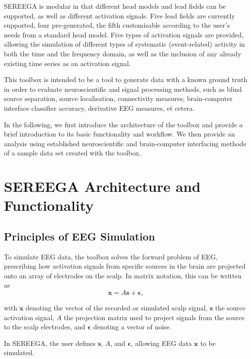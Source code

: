SEREEGA is modular in that different head models and lead fields can be supported, as well as different activation signals. Five lead fields are currently supported, four pre-generated, the fifth customisable according to the user's needs from a standard head model. Five types of activation signals are provided, allowing the simulation of different types of systematic (event-related) activity in both the time and the frequency domain, as well as the inclusion of any already existing time series as an activation signal.

This toolbox is intended to be a tool to generate data with a known ground truth in order to evaluate neuroscientific and signal processing methods, such as blind source separation, source localisation, connectivity measures, brain-computer interface classifier accuracy, derivative EEG measures, et cetera.

In the following, we first introduce the architecture of the toolbox and provide a brief introduction to its basic functionality and workflow. We then provide an analysis using established neuroscientific and brain-computer interfacing methods of a sample data set created with the toolbox. 


\section{SEREEGA Architecture and Functionality}
%

\subsection{Principles of EEG Simulation}
\label{sereega:principles}

To simulate EEG data, the toolbox solves the forward problem of EEG, prescribing how activation signals from specific sources in the brain are projected onto an array of electrodes on the scalp. In matrix notation, this can be written as
$$\bm{x} = A\bm{s} + \bm{\epsilon},$$

with $\bm{x}$ denoting the vector of the recorded or simulated scalp signal, $\bm{s}$ the source activation signal, $A$ the projection matrix used to project signals from the source to the scalp electrodes, and $\bm{\epsilon}$ denoting a vector of noise.

In SEREEGA, the user defines $\bm{s}$, $A$, and $\bm{\epsilon}$, allowing EEG data $\bm{x}$ to be simulated.

